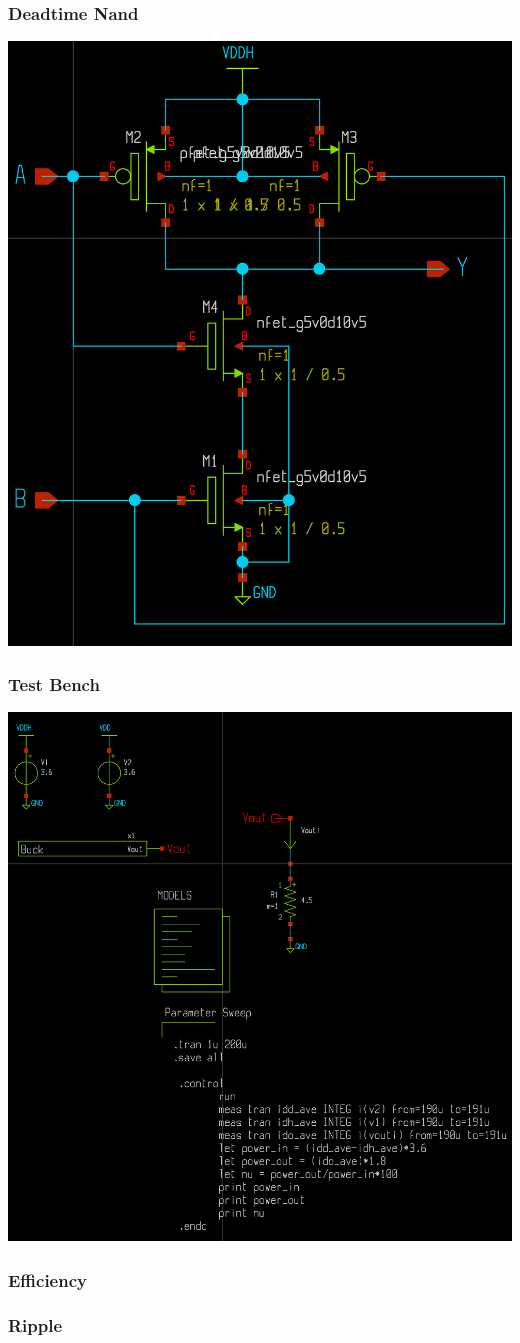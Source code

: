 \documentclass{beamer}
\begin{document}
\begin{frame}
  \frametitle{Deadtime Nand}
  \includegraphics[scale=0.09]{nand.png}
\end{frame}

\begin{frame}
  \frametitle{Test Bench}
  \includegraphics[scale=0.10]{testbench.png}
\end{frame}

\begin{frame}
  \frametitle{Efficiency}
\end{frame}

\begin{frame}
  \frametitle{Ripple}
\end{frame}
\end{document}
